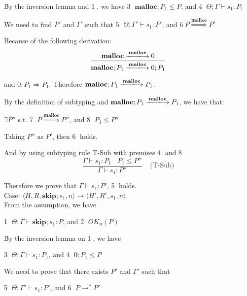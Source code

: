 \documentclass[english]{jssst_ppl} %
\newcommand\SKIP{\mathbf{skip}}
\newcommand\Rtab{\; \; \; \;}
\newcommand\Malloc{\mathbf{malloc}}
\begin{document}
By the inversion lemma and \textcircled{1}, we have \textcircled{3} $\Malloc;P_{1} \le P$, and \textcircled{4} $\Theta; \Gamma \vdash s_{1} : P_{1}$

We need to find $P'$ and $\Gamma'$ such that \textcircled{5} $\Theta; \Gamma' \vdash s_{1} : P'$, and \textcircled{6}$P \overset{\text{$\Malloc$}}{\Longrightarrow} P'$

Because of the following derivation:
$$
  \frac{ \Malloc \xlongrightarrow{\Malloc} 0}
  {\Malloc;P_{1} \xlongrightarrow{\Malloc} 0;P_{1}}
$$

and $0;P_{1} \Rightarrow P_{1}$. Therefore $\Malloc;P_{1} \xlongrightarrow{\Malloc} P_{1}$.

By the definition of subtyping and $\Malloc;P_{1} \xlongrightarrow{\Malloc} P_{1}$, we have that:
\begin{center}
$\exists P''$ s.t. \textcircled{7} $P \overset{\text{$\Malloc$}}{\Longrightarrow} P''$, and \textcircled{8} $P_{1} \le P''$
 \end{center}

Taking $P''$ as $P'$, then \textcircled{6} holds.

And by using subtyping rule T-Sub with premises \textcircled{4} and \textcircled{8}
$$
    \frac{\Gamma \vdash s_{1} : P_{1} \ \ \ \ P_{1} \le P''}
     {\Gamma \vdash s_{1} : P''}
     \Rtab \mbox{(T-Sub)}
$$

Therefore we prove that $\Gamma \vdash s_{1} : P'$, \textcircled{5} holds.\\

\noindent Case: $\langle H, R, \SKIP;s_{1}, n \rangle \rightarrow \langle H', R', s_{1}, n \rangle $. \\

From the assumption, we have
\begin{center}
\textcircled{1} $\Theta; \Gamma \vdash \SKIP;s_{1} : P$, and \textcircled{2} $OK_{n}(P)$
\end{center}

By the inversion lemma on \textcircled{1}, we have
\begin{center}
\textcircled{3} $\Theta; \Gamma \vdash s_{1} : P_{1}$, and \textcircled{4} $0;P_{1} \le P $
\end{center}

We need to prove that there exists $P'$ and $\Gamma'$ such that
\begin{center}
\textcircled{5} $\Theta; \Gamma' \vdash s_{1} : P'$, and \textcircled{6} $P \rightarrow^{*} P'$
\end{center}
\end{document}
